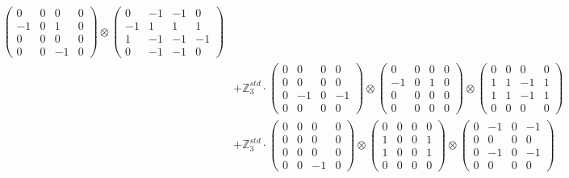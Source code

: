 \documentclass{article}
\begin{document}
{\begin{align}
            \begin{pmatrix} 0 & 0 & 0 & 0 \\ -1 & 0 & 1 & 0 \\ 0 & 0 & 0 & 0 \\ 0 & 0 & -1 & 0 \end{pmatrix} \otimes 
            \begin{pmatrix} 0 & -1 & -1 & 0 \\ -1 & 1 & 1 & 1 \\ 1 & -1 & -1 & -1 \\ 0 & -1 & -1 & 0 \end{pmatrix} \\ 
        &+ \label{Rs16-Rc11-Solution-10-c20} \mathbb{Z}_3^{std} \cdot 
            \begin{pmatrix} 0 & 0 & 0 & 0 \\ 0 & 0 & 0 & 0 \\ 0 & -1 & 0 & -1 \\ 0 & 0 & 0 & 0 \end{pmatrix} \otimes 
            \begin{pmatrix} 0 & 0 & 0 & 0 \\ -1 & 0 & 1 & 0 \\ 0 & 0 & 0 & 0 \\ 0 & 0 & 0 & 0 \end{pmatrix} \otimes 
            \begin{pmatrix} 0 & 0 & 0 & 0 \\ 1 & 1 & -1 & 1 \\ 1 & 1 & -1 & 1 \\ 0 & 0 & 0 & 0 \end{pmatrix} \\ 
        &+ \label{Rs16-Rc11-Solution-10-c21} \mathbb{Z}_3^{std} \cdot 
            \begin{pmatrix} 0 & 0 & 0 & 0 \\ 0 & 0 & 0 & 0 \\ 0 & 0 & 0 & 0 \\ 0 & 0 & -1 & 0 \end{pmatrix} \otimes 
            \begin{pmatrix} 0 & 0 & 0 & 0 \\ 1 & 0 & 0 & 1 \\ 1 & 0 & 0 & 1 \\ 0 & 0 & 0 & 0 \end{pmatrix} \otimes 
            \begin{pmatrix} 0 & -1 & 0 & -1 \\ 0 & 0 & 0 & 0 \\ 0 & -1 & 0 & -1 \\ 0 & 0 & 0 & 0 \end{pmatrix} \\ 

\end{align}}
\end{document}
